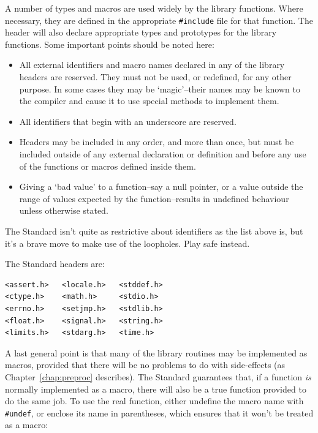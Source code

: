    A number of types and macros are used widely by the library
    functions.  Where necessary, they are defined in the
    appropriate \texttt{\#include} file for that function.  The header
    will also declare appropriate types and prototypes for the
    library functions.  Some important points should be noted
    here:


   \begin{itemize}
    \item All external identifiers and macro names declared in any
     of the library headers are reserved.  They must not be
     used, or redefined, for any other purpose.  In some cases
     they may be `magic'--their names may be known to the
     compiler and cause it to use special methods to implement
     them.

    \item All identifiers that begin with an underscore are
     reserved.

    \item Headers may be included in any order, and more than once,
     but must be included outside of any external declaration
     or definition and before any use of the functions or
     macros defined inside them.

    \item Giving a `bad value' to a function--say a null pointer,
     or a value outside the range of values expected by the
     function--results in undefined behaviour unless
     otherwise stated.
   \end{itemize}

   The Standard isn't quite as restrictive about identifiers as
    the list above is, but it's a brave move to make use of the
    loopholes.  Play safe instead.


   The Standard headers are:


   \begin{Verbatim}
<assert.h>   <locale.h>   <stddef.h>
<ctype.h>    <math.h>     <stdio.h>
<errno.h>    <setjmp.h>   <stdlib.h>
<float.h>    <signal.h>   <string.h>
<limits.h>   <stdarg.h>   <time.h>
\end{Verbatim}

   A last general point is that many of  the  library  routines
    may be implemented as macros, provided that there will be no
    problems to do with side-effects (as Chapter~\ref{chap:preproc} describes).
    The  Standard  guarantees  that,  if  a function \textit{is} normally
    implemented as a macro, there will also be a  true  function
    provided  to  do  the  same  job.  To use the real function,
    either undefine the macro name with \texttt{\#undef}, or  enclose  its
    name  in parentheses, which ensures that it won't be treated
    as a macro:


